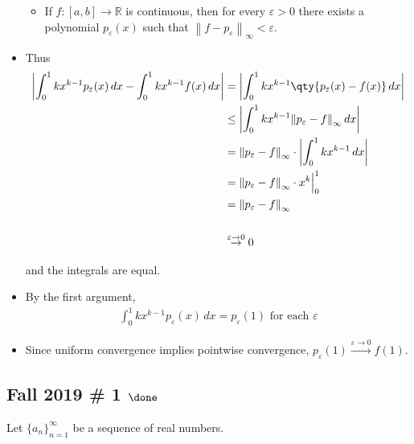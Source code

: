 \begin{solution}
\begin{itemize}
  \begin{itemize}
  \tightlist
  \item
    If \(f: [a, b] \to {\mathbb{R}}\) is continuous, then for every
    \({\varepsilon}>0\) there exists a polynomial \(p_{\varepsilon}(x)\)
    such that
    \({\left\lVert {f - p_{\varepsilon}} \right\rVert}_\infty < {\varepsilon}\).
  \end{itemize}
\item
  Thus
  \begin{align*}
  {\left\lvert { \int_0^1 kx^{k-1} p_{\varepsilon}(x)\,dx - \int_0^1 kx^{k-1}f(x)\,dx  } \right\rvert} 
  &= {\left\lvert { \int_0^1 kx^{k-1} \qty{p_{\varepsilon}(x) - f(x)} \,dx  } \right\rvert} \\
  &\leq {\left\lvert { \int_0^1 kx^{k-1} {\left\lVert {p_{\varepsilon}-f} \right\rVert}_\infty \,dx  } \right\rvert} \\
  &= {\left\lVert {p_{\varepsilon}-f} \right\rVert}_\infty \cdot {\left\lvert { \int_0^1 kx^{k-1} \,dx  } \right\rvert} \\
  &= {\left\lVert {p_{\varepsilon}-f} \right\rVert}_\infty \cdot x^k \Big|_0^1 \\
  &= {\left\lVert {p_{\varepsilon}-f} \right\rVert}_\infty \\ \\
  &\overset{{\varepsilon}\to 0}\to 0
  \end{align*}

  and the integrals are equal.
\item
  By the first argument,
  \begin{align*}\int_0^1 kx^{k-1} p_{\varepsilon}(x) \,dx = p_{\varepsilon}(1) \text{ for each } {\varepsilon}\end{align*}
\item
  Since uniform convergence implies pointwise convergence,
  \(p_{\varepsilon}(1) \overset{{\varepsilon}\to 0}\to f(1)\).
\end{itemize}

\end{solution}

\hypertarget{fall-2019-1-done}{%
\subsection{\texorpdfstring{Fall 2019 \# 1
\(\done\)}{Fall 2019 \# 1 \textbackslash done}}\label{fall-2019-1-done}}

Let \(\{a_n\}_{n=1}^\infty\) be a sequence of real numbers.

